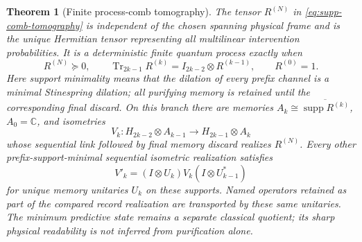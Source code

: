 \documentclass[11pt]{article}
\newtheorem{theorem}{Theorem}[section]
\numberwithin{equation}{section}
\theoremstyle{definition}
\theoremstyle{remark}
\newcommand{\C}{\mathbb C}
\newcommand{\Tr}{\operatorname{Tr}}
\newcommand{\supp}{\operatorname{supp}}
\begin{document}
\begin{theorem}[Finite process-comb tomography]
\label{thm:supp-comb-tomography}
The tensor $R^{(N)}$ in \eqref{eq:supp-comb-tomography} is independent of the
chosen spanning physical frame and is the unique Hermitian tensor representing
all multilinear intervention probabilities.  It is a deterministic finite
quantum process exactly when
\begin{equation}
 R^{(N)}\succeq0,
 \qquad
 \Tr_{2k-1}R^{(k)}=I_{2k-2}\otimes R^{(k-1)},
 \qquad
 R^{(0)}=1.
 \label{eq:supp-comb-conditions}
\end{equation}
Here support minimality means that the dilation of every prefix channel
is a minimal Stinespring dilation; all purifying memory is retained until
the corresponding final discard. On this branch there are memories
$A_k\cong\overline{\supp R^{(k)}}$, $A_0=\C$, and isometries
\begin{equation}
 V_k:H_{2k-2}\otimes A_{k-1}
 \longrightarrow H_{2k-1}\otimes A_k
 \label{eq:supp-comb-isometry}
\end{equation}
whose sequential link followed by final memory discard realizes $R^{(N)}$.
Every other prefix-support-minimal sequential isometric realization satisfies
\begin{equation}
 V'_k=(I\otimes U_k)V_k(I\otimes U_{k-1}^*)
 \label{eq:supp-comb-unitary}
\end{equation}
for unique memory unitaries $U_k$ on these supports. Named operators
retained as part of the compared record realization are transported by
these same unitaries. The minimum predictive state remains a separate
classical quotient; its sharp physical readability is not inferred from
purification alone.
\end{theorem}
\end{document}
